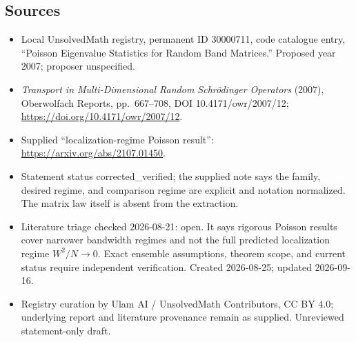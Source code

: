 \documentclass[11pt]{article}
\begin{document}
\subsection{Sources}
\begin{itemize}
\item Local UnsolvedMath registry, permanent ID 30000711, code catalogue entry, ``Poisson Eigenvalue Statistics for Random Band Matrices.'' Proposed year 2007; proposer unspecified.
\item \emph{Transport in Multi-Dimensional Random Schr\"odinger Operators} (2007), Oberwolfach Reports, pp.\ 667--708, DOI 10.4171/owr/2007/12; \url{https://doi.org/10.4171/owr/2007/12}.
\item Supplied ``localization-regime Poisson result'': \url{https://arxiv.org/abs/2107.01450}.
\item Statement status corrected\_verified; the supplied note says the family, desired regime, and comparison regime are explicit and notation normalized. The matrix law itself is absent from the extraction.
\item Literature triage checked 2026-08-21: open. It says rigorous Poisson results cover narrower bandwidth regimes and not the full predicted localization regime $W^2/N\to0$. Exact ensemble assumptions, theorem scope, and current status require independent verification. Created 2026-08-25; updated 2026-09-16.
\item Registry curation by Ulam AI / UnsolvedMath Contributors, CC BY 4.0; underlying report and literature provenance remain as supplied. Unreviewed statement-only draft.
\end{itemize}
\end{document}
